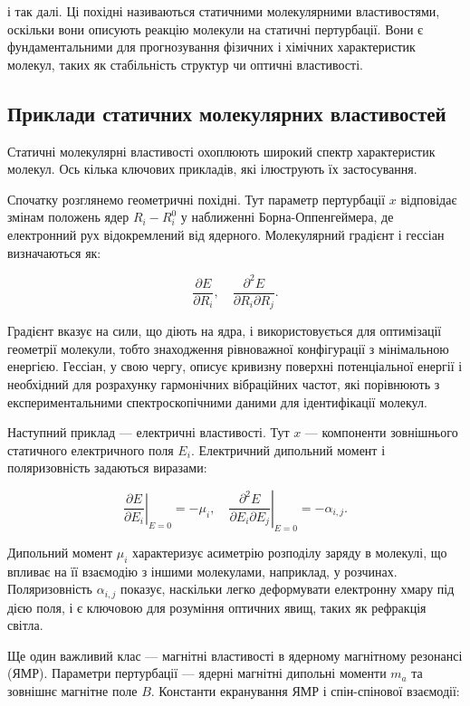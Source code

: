 \documentclass{PySCFBook}
\begin{document}
і так далі. Ці похідні називаються статичними молекулярними властивостями, оскільки вони описують реакцію молекули на статичні пертурбації. Вони є фундаментальними для прогнозування фізичних і хімічних характеристик молекул, таких як стабільність структур чи оптичні властивості.

\subsection{Приклади статичних молекулярних властивостей}

Статичні молекулярні властивості охоплюють широкий спектр характеристик молекул. Ось кілька ключових прикладів, які ілюструють їх застосування.

Спочатку розглянемо геометричні похідні. Тут параметр пертурбації \(x\) відповідає змінам положень ядер \(R_i - R_i^0\) у наближенні Борна-Оппенгеймера, де електронний рух відокремлений від ядерного. Молекулярний градієнт і гессіан визначаються як:

\[
\frac{\partial E}{\partial R_i}, \quad \frac{\partial^2 E}{\partial R_i \partial R_j}.
\]

Градієнт вказує на сили, що діють на ядра, і використовується для оптимізації геометрії молекули, тобто знаходження рівноважної конфігурації з мінімальною енергією. Гессіан, у свою чергу, описує кривизну поверхні потенціальної енергії і необхідний для розрахунку гармонічних вібраційних частот, які порівнюють з експериментальними спектроскопічними даними для ідентифікації молекул.

Наступний приклад — електричні властивості. Тут \(x\) — компоненти зовнішнього статичного електричного поля \(E_i\). Електричний дипольний момент і поляризовність задаються виразами:

\[
\left. \frac{\partial E}{\partial E_i} \right|_{E=0} = -\mu_i, \quad \left. \frac{\partial^2 E}{\partial E_i \partial E_j} \right|_{E=0} = -\alpha_{i,j}.
\]

Дипольний момент \(\mu_i\) характеризує асиметрію розподілу заряду в молекулі, що впливає на її взаємодію з іншими молекулами, наприклад, у розчинах. Поляризовність \(\alpha_{i,j}\) показує, наскільки легко деформувати електронну хмару під дією поля, і є ключовою для розуміння оптичних явищ, таких як рефракція світла.

Ще один важливий клас — магнітні властивості в ядерному магнітному резонансі (ЯМР). Параметри пертурбації — ядерні магнітні дипольні моменти \(m_a\) та зовнішнє магнітне поле \(B\). Константи екранування ЯМР і спін-спінової взаємодії:
\end{document}
